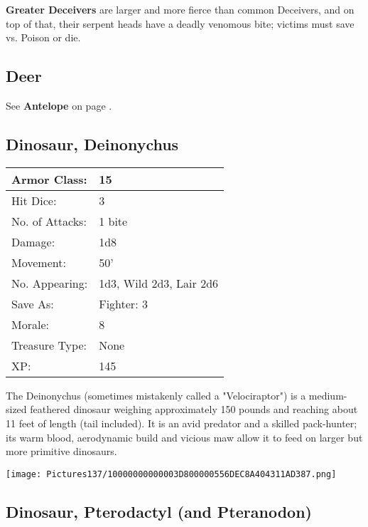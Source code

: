 \documentclass[a4paper,twoside,openany,10pt]{book}
\begin{document}
\begin{multicols}{2}
\textbf{Greater Deceivers} are larger and more fierce than common Deceivers,
and on top of that, their serpent heads have a deadly venomous bite;
victims must save vs. Poison or die.

\subsection*{Deer}\label{deer}

See \textbf{Antelope} on page \hyperlink{antelope}{\pageref{antelope}}.

\subsection*{Dinosaur, Deinonychus}\label{dinosaur-deinonychus}

\begin{tabularx}{0.48\textwidth}{@{}lX@{}}
Armor Class: & 15 \\\hline
Hit Dice: & 3 \\\hline
No. of Attacks: & 1 bite \\\hline
Damage: & 1d8 \\\hline
Movement: & 50' \\\hline
No. Appearing: & 1d3, Wild 2d3, Lair 2d6 \\\hline
Save As: & Fighter: 3 \\\hline
Morale: & 8 \\\hline
Treasure Type: & None \\\hline
XP: & 145 \\\hline
\end{tabularx}\medskip

The Deinonychus (sometimes mistakenly called a "Velociraptor") is a medium-sized feathered dinosaur weighing approximately 150 pounds and reaching about 11 feet of length (tail included). It is an avid predator and a skilled pack-hunter; its warm blood, aerodynamic build and vicious maw allow it to feed on larger but more primitive dinosaurs.

\begin{center}
	\texttt{[image: Pictures137/10000000000003D800000556DEC8A404311AD387.png]}
\end{center}

\subsection*{Dinosaur, Pterodactyl (and Pteranodon)}\label{dinosaur-pterodactyl-and-pteranodon}


\end{multicols}
\end{document}
